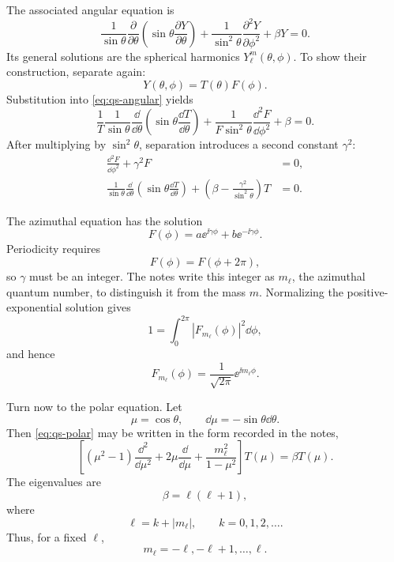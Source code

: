 The associated angular equation is
\begin{equation}
  \frac{1}{\sin\theta}\frac{\partial}{\partial\theta}
  \left(\sin\theta\frac{\partial Y}{\partial\theta}\right)
  +\frac{1}{\sin^2\theta}\frac{\partial^2Y}{\partial\phi^2}
  +\beta Y=0.
  \label{eq:qs-angular}
\end{equation}
Its general solutions are the spherical harmonics $Y_\ell^m(\theta,\phi)$.  To show their construction, separate again:
\[
  Y(\theta,\phi)=T(\theta)F(\phi).
\]
Substitution into \eqref{eq:qs-angular} yields
\[
  \frac{1}{T}\frac{1}{\sin\theta}\frac{\dd}{\dd\theta}
  \left(\sin\theta\frac{\dd T}{\dd\theta}\right)
  +\frac{1}{F\sin^2\theta}\frac{\dd^2F}{\dd\phi^2}
  +\beta=0.
\]
After multiplying by $\sin^2\theta$, separation introduces a second constant $\gamma^2$:
\begin{align}
  \frac{\dd^2F}{\dd\phi^2}+\gamma^2F&=0,
  \label{eq:qs-azimuth}\\
  \frac{1}{\sin\theta}\frac{\dd}{\dd\theta}
  \left(\sin\theta\frac{\dd T}{\dd\theta}\right)
  +\left(\beta-\frac{\gamma^2}{\sin^2\theta}\right)T&=0.
  \label{eq:qs-polar}
\end{align}

The azimuthal equation has the solution
\[
  F(\phi)=a\ee^{\ii\gamma\phi}+b\ee^{-\ii\gamma\phi}.
\]
Periodicity requires
\[
  F(\phi)=F(\phi+2\pi),
\]
so $\gamma$ must be an integer.  The notes write this integer as $m_\ell$, the azimuthal quantum number, to distinguish it from the mass $m$.  Normalizing the positive-exponential solution gives
\[
  1=\int_0^{2\pi}|F_{m_\ell}(\phi)|^2\dd\phi,
\]
and hence
\begin{equation}
  F_{m_\ell}(\phi)=\frac{1}{\sqrt{2\pi}}\ee^{\ii m_\ell\phi}.
  \label{eq:qs-Fm}
\end{equation}

Turn now to the polar equation.  Let
\[
  \mu=\cos\theta,
  \qquad
  \dd\mu=-\sin\theta\dd\theta.
\]
Then \eqref{eq:qs-polar} may be written in the form recorded in the notes,
\begin{equation}
  \left[(\mu^2-1)\frac{\dd^2}{\dd\mu^2}
  +2\mu\frac{\dd}{\dd\mu}
  +\frac{m_\ell^2}{1-\mu^2}\right]T(\mu)
  =\beta T(\mu).
  \label{eq:qs-associated-legendre}
\end{equation}
The eigenvalues are
\[
  \beta=\ell(\ell+1),
\]
where
\[
  \ell=k+|m_\ell|,
  \qquad k=0,1,2,\ldots.
\]
Thus, for a fixed $\ell$,
\[
  m_\ell=-\ell,-\ell+1,\ldots,\ell.
\]

